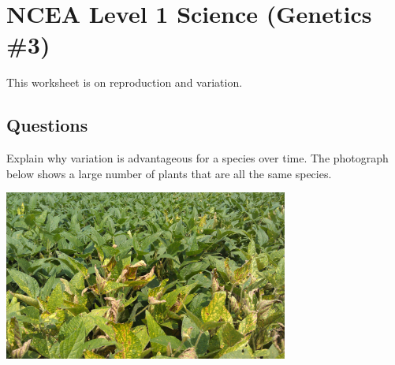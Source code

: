 \documentclass{exam}
\begin{document}
\section*{NCEA Level 1 Science (Genetics \#3)}

This worksheet is on reproduction and variation.

\subsection*{Questions}
\begin{questions}
  \question Explain why variation is advantageous for a species over time.
  \question {[NZQA 2015]} The photograph below shows a large number of plants that are all the same species.
            \begin{center}
              \includegraphics[width=0.7\textwidth]{stemrot}
            \end{center}
\end{questions}
\end{document}
